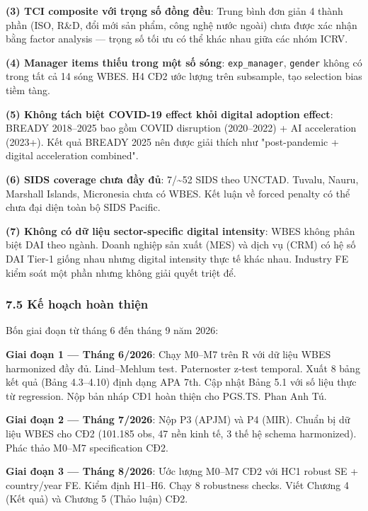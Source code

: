 \documentclass[12pt,a4paper]{article}
\begin{document}
\textbf{(3) TCI composite với trọng số đồng đều}: Trung bình đơn giản 4
thành phần (ISO, R\&D, đổi mới sản phẩm, công nghệ nước ngoài) chưa được
xác nhận bằng factor analysis --- trọng số tối ưu có thể khác nhau giữa
các nhóm ICRV.

\textbf{(4) Manager items thiếu trong một số sóng}:
\texttt{exp\_manager}, \texttt{gender} không có trong tất cả 14 sóng
WBES. H4 CĐ2 ước lượng trên subsample, tạo selection bias tiềm tàng.

\textbf{(5) Không tách biệt COVID-19 effect khỏi digital adoption
effect}: BREADY 2018--2025 bao gồm COVID disruption (2020--2022) + AI
acceleration (2023+). Kết quả BREADY 2025 nên được giải thích như
"post-pandemic + digital acceleration combined".

\textbf{(6) SIDS coverage chưa đầy đủ}: 7/\textasciitilde52 SIDS theo
UNCTAD. Tuvalu, Nauru, Marshall Islands, Micronesia chưa có WBES. Kết
luận về forced penalty có thể chưa đại diện toàn bộ SIDS Pacific.

\textbf{(7) Không có dữ liệu sector-specific digital intensity}: WBES
không phân biệt DAI theo ngành. Doanh nghiệp sản xuất (MES) và dịch vụ
(CRM) có hệ số DAI Tier-1 giống nhau nhưng digital intensity thực tế
khác nhau. Industry FE kiểm soát một phần nhưng không giải quyết triệt
để.

\hypertarget{75-kux1ebf-houx1ea1ch-houxe0n-thiux1ec7n}{%
\subsubsection{7.5 Kế hoạch hoàn
thiện}\label{75-kux1ebf-houx1ea1ch-houxe0n-thiux1ec7n}}

Bốn giai đoạn từ tháng 6 đến tháng 9 năm 2026:

\textbf{Giai đoạn 1 --- Tháng 6/2026}: Chạy M0--M7 trên R với dữ liệu
WBES harmonized đầy đủ. Lind--Mehlum test. Paternoster z-test temporal.
Xuất 8 bảng kết quả (Bảng 4.3--4.10) định dạng APA 7th. Cập nhật Bảng
5.1 với số liệu thực từ regression. Nộp bản nháp CĐ1 hoàn thiện cho
PGS.TS. Phan Anh Tú.

\textbf{Giai đoạn 2 --- Tháng 7/2026}: Nộp P3 (APJM) và P4 (MIR). Chuẩn
bị dữ liệu WBES cho CĐ2 (101.185 obs, 47 nền kinh tế, 3 thế hệ schema
harmonized). Phác thảo M0--M7 specification CĐ2.

\textbf{Giai đoạn 3 --- Tháng 8/2026}: Ước lượng M0--M7 CĐ2 với HC1
robust SE + country/year FE. Kiểm định H1--H6. Chạy 8 robustness checks.
Viết Chương 4 (Kết quả) và Chương 5 (Thảo luận) CĐ2.
\end{document}
